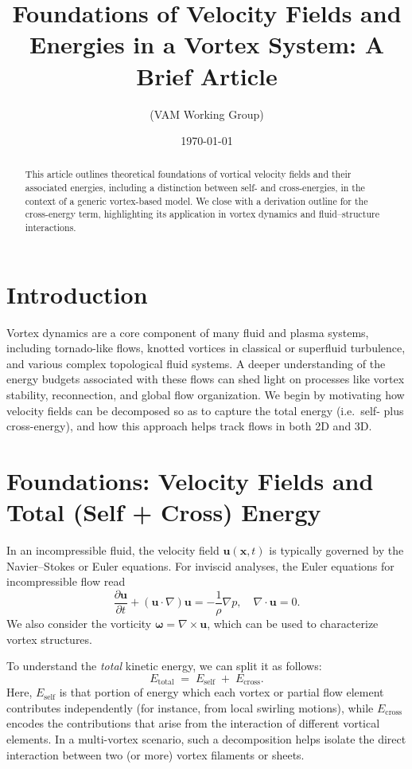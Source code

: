 \documentclass[11pt]{article}
\begin{document}
\title{Foundations of Velocity Fields and Energies in a Vortex System: A Brief Article}
\author{(VAM Working Group)}
\date{\today}
\maketitle

\begin{abstract}
This article outlines theoretical foundations of vortical velocity fields and their associated energies,
including a distinction between self- and cross-energies, in the context of a generic vortex-based model.
We close with a derivation outline for the cross-energy term, highlighting its application in vortex dynamics
and fluid–structure interactions.
\end{abstract}

\section{Introduction}
Vortex dynamics are a core component of many fluid and plasma systems, including
tornado-like flows, knotted vortices in classical or superfluid turbulence, and various
complex topological fluid systems. A deeper understanding of the energy budgets
associated with these flows can shed light on processes like vortex stability, reconnection,
and global flow organization. We begin by motivating how velocity fields can be
decomposed so as to capture the total energy (i.e.\ self- plus cross-energy), and how
this approach helps track flows in both 2D and 3D.

\section{Foundations: Velocity Fields and Total (Self + Cross) Energy}
\label{sec:foundations}
In an incompressible fluid, the velocity field $\mathbf{u}(\mathbf{x}, t)$ is typically
governed by the Navier--Stokes or Euler equations. For inviscid analyses, the Euler
equations for incompressible flow read
\begin{equation}
  \frac{\partial \mathbf{u}}{\partial t} + (\mathbf{u} \cdot \nabla)\mathbf{u} = -\frac{1}{\rho}\nabla p,
  \quad \nabla \cdot \mathbf{u} = 0.
\end{equation}
We also consider the vorticity $\boldsymbol{\omega} = \nabla \times \mathbf{u}$,
which can be used to characterize vortex structures.

To understand the \emph{total} kinetic energy, we can split it as follows:
\begin{equation}
  E_{\text{total}} \;=\; E_{\text{self}} \;+\; E_{\text{cross}}.
\end{equation}
Here, $E_{\text{self}}$ is that portion of energy which each vortex or partial flow
element contributes independently (for instance, from local swirling motions), while
$E_{\text{cross}}$ encodes the contributions that arise from the interaction of different
vortical elements. In a multi-vortex scenario, such a decomposition helps isolate the
direct interaction between two (or more) vortex filaments or sheets.
\end{document}
